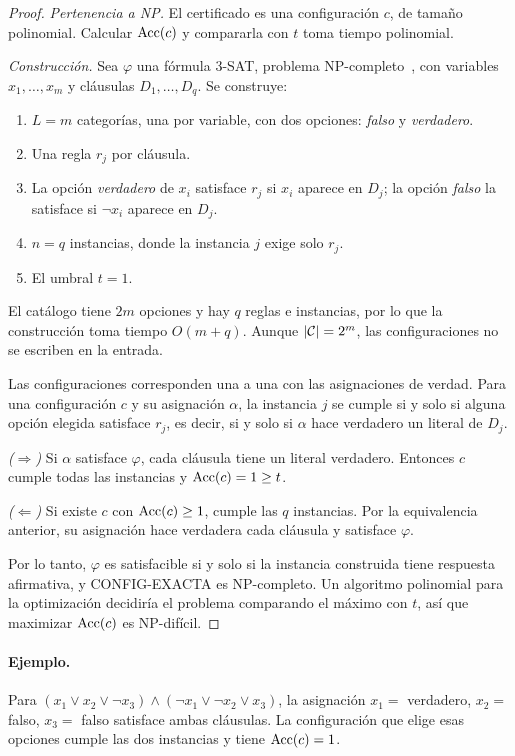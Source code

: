 \begin{proof}
\emph{Pertenencia a NP.} El certificado es una configuración $c$, de tamaño polinomial.
Calcular $\operatorname{Acc}(c)$ y compararla con $t$ toma tiempo polinomial.

\emph{Construcción.} Sea $\varphi$ una fórmula 3-SAT, problema NP-completo~\cite{karp1972},
con variables $x_1,\dots,x_m$ y cláusulas $D_1,\dots,D_q$. Se construye:
\begin{enumerate}
  \item $L=m$ categorías, una por variable, con dos opciones: \emph{falso} y \emph{verdadero}.
  \item Una regla $r_j$ por cláusula.
  \item La opción \emph{verdadero} de $x_i$ satisface $r_j$ si $x_i$ aparece en $D_j$; la
  opción \emph{falso} la satisface si $\lnot x_i$ aparece en $D_j$.
  \item $n=q$ instancias, donde la instancia $j$ exige solo $r_j$.
  \item El umbral $t=1$.
\end{enumerate}
El catálogo tiene $2m$ opciones y hay $q$ reglas e instancias, por lo que la construcción
toma tiempo $O(m+q)$. Aunque $|\mathcal{C}|=2^m$, las configuraciones no se escriben en la entrada.

Las configuraciones corresponden una a una con las asignaciones de verdad. Para una
configuración $c$ y su asignación $\alpha$, la instancia $j$ se cumple si y solo si alguna
opción elegida satisface $r_j$, es decir, si y solo si $\alpha$ hace verdadero un literal
de $D_j$.

\emph{($\Rightarrow$)} Si $\alpha$ satisface $\varphi$, cada cláusula tiene un literal
verdadero. Entonces $c$ cumple todas las instancias y $\operatorname{Acc}(c)=1\ge t$.

\emph{($\Leftarrow$)} Si existe $c$ con $\operatorname{Acc}(c)\ge 1$, cumple las $q$ instancias. Por la
equivalencia anterior, su asignación hace verdadera cada cláusula y satisface $\varphi$.

Por lo tanto, $\varphi$ es satisfacible si y solo si la instancia construida tiene
respuesta afirmativa, y CONFIG-EXACTA es NP-completo. Un algoritmo polinomial para la
optimización decidiría el problema comparando el máximo con $t$, así que maximizar
$\operatorname{Acc}(c)$ es NP-difícil.
\end{proof}

\paragraph{Ejemplo.} Para $(x_1\lor x_2\lor\lnot x_3)\land(\lnot x_1\lor\lnot x_2\lor x_3)$,
la asignación $x_1=$ verdadero, $x_2=$ falso, $x_3=$ falso satisface ambas cláusulas. La
configuración que elige esas opciones cumple las dos instancias y tiene $\operatorname{Acc}(c)=1$.

